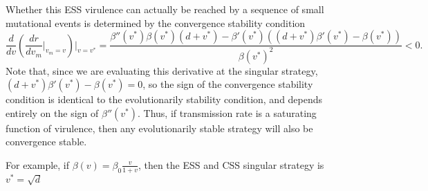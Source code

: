 \documentclass[12pt,reqno,final,pdftex]{amsart}\usepackage[]{graphicx}\usepackage[]{color}
\theoremstyle{plain}
\numberwithin{equation}{part}
\begin{document}
Whether this ESS virulence can actually be reached by a sequence of small mutational events is determined by the convergence stability condition
\begin{equation}
\frac{d}{dv}\left(\frac{dr}{dv_m}|_{v_m=v}\right)|_{v=v^*} = \frac{\beta''(v^*) \beta(v^*) (d+v^*) - \beta'(v^*)\left((d+v^*)\beta'(v^*)-\beta(v^*)\right)}{\beta(v^*)^2} < 0.
\end{equation}
Note that, since we are evaluating this derivative at the singular strategy, $(d+v^*)\beta'(v^*)-\beta(v^*) = 0$, so the sign of the convergence stability condition is identical to the evolutionarily stability condition, and depends entirely on the sign of $\beta''(v^*)$.
Thus, if transmission rate is a saturating function of virulence, then any evolutionarily stable strategy will also be convergence stable.

For example, if $\beta(v) = \beta_0 \frac{v}{1+v}$, then the ESS and CSS singular strategy is $v^* = \sqrt{d}$
\end{document}
